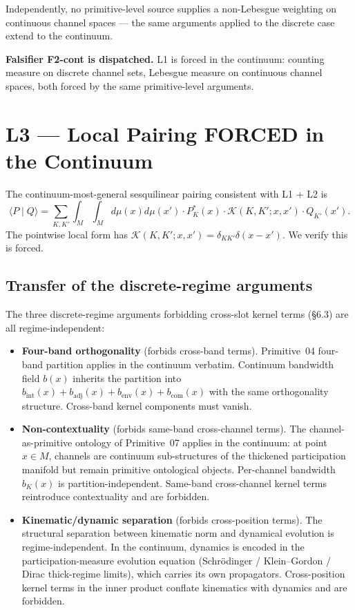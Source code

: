 \documentclass[11pt,a4paper]{article}
\begin{document}
Independently, no primitive-level source supplies a non-Lebesgue weighting on continuous channel spaces --- the same arguments applied to the discrete case extend to the continuum.

\textbf{Falsifier F2-cont is dispatched.} L1 is forced in the continuum: counting measure on discrete channel sets, Lebesgue measure on continuous channel spaces, both forced by the same primitive-level arguments.

\section{L3 --- Local Pairing FORCED in the Continuum}\label{sec:l3}

The continuum-most-general sesquilinear pairing consistent with L1 + L2 is
\begin{equation}
\langle P \mid Q \rangle = \sum_{K, K'} \int_M \int_M d\mu(x) d\mu(x') \cdot P_K^*(x) \cdot \mathcal{K}(K, K'; x, x') \cdot Q_{K'}(x').
\label{eq:contgeneralkernel}
\end{equation}
The pointwise local form has $\mathcal{K}(K, K'; x, x') = \delta_{KK'} \delta(x - x')$. We verify this is forced.

\subsection{Transfer of the discrete-regime arguments}

The three discrete-regime arguments forbidding cross-slot kernel terms (\S 6.3) are all regime-independent:

\begin{itemize}
  \item \textbf{Four-band orthogonality} (forbids cross-band terms). Primitive~04 four-band partition applies in the continuum verbatim. Continuum bandwidth field $b(x)$ inherits the partition into $b_\mathrm{int}(x) + b_\mathrm{adj}(x) + b_\mathrm{env}(x) + b_\mathrm{com}(x)$ with the same orthogonality structure. Cross-band kernel components must vanish.
  \item \textbf{Non-contextuality} (forbids same-band cross-channel terms). The channel-as-primitive ontology of Primitive~07 applies in the continuum: at point $x \in M$, channels are continuum sub-structures of the thickened participation manifold but remain primitive ontological objects. Per-channel bandwidth $b_K(x)$ is partition-independent. Same-band cross-channel kernel terms reintroduce contextuality and are forbidden.
  \item \textbf{Kinematic/dynamic separation} (forbids cross-position terms). The structural separation between kinematic norm and dynamical evolution is regime-independent. In the continuum, dynamics is encoded in the participation-measure evolution equation (Schr\"odinger / Klein--Gordon / Dirac thick-regime limits), which carries its own propagators. Cross-position kernel terms in the inner product conflate kinematics with dynamics and are forbidden.
\end{itemize}
\end{document}
